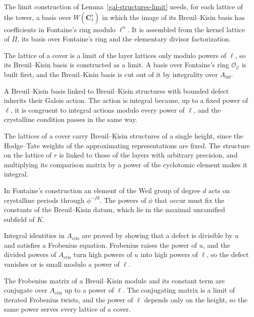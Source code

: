 The limit construction of Lemma~\ref{gal-structures-limit} needs, for each lattice of the tower, a basis over
$W(\mathbf C_\ell^\flat)$ in which the image of its Breuil--Kisin basis has coefficients in Fontaine's ring
modulo $\ell^n$. It is assembled from the kernel lattice of $\Pi$, its basis over Fontaine's ring and the
elementary divisor factorization.

The lattice of a cover is a limit of the layer lattices only modulo powers of $\ell$, so its Breuil--Kisin
basis is constructed as a limit. A basis over Fontaine's ring $\mathcal O_{\mathcal E}$ is built first, and the
Breuil--Kisin basis is cut out of it by integrality over $A_{\inf}$.

A Breuil--Kisin basis linked to Breuil--Kisin structures with bounded defect inherits their Galois action.
The action is integral because, up to a fixed power of $\ell$, it is congruent to integral actions modulo
every power of $\ell$, and the crystalline condition passes in the same way.

The lattices of a cover carry Breuil--Kisin structures of a single height, since the Hodge--Tate weights
of the approximating representations are fixed. The structure on the lattice of $r$ is linked to those
of the layers with arbitrary precision, and multiplying its comparison matrix by a power of the
cyclotomic element makes it integral.

In Fontaine's construction an element of the Weil group of degree $d$ acts on crystalline periods
through $\phi^{-fd}$. The powers of $\phi$ that occur must fix the constants of the Breuil--Kisin datum,
which lie in the maximal unramified subfield of $K$.

Integral identities in $A_{\mathrm{cris}}$ are proved by showing that a defect is divisible by $u$ and
satisfies a Frobenius equation. Frobenius raises the power of $u$, and the divided powers of
$A_{\mathrm{cris}}$ turn high powers of $u$ into high powers of $\ell$, so the defect vanishes or is
small modulo a power of $\ell$.

The Frobenius matrix of a Breuil--Kisin module and its constant term are conjugate over
$A_{\mathrm{cris}}$ up to a power of $\ell$. The conjugating matrix is a limit of iterated Frobenius
twists, and the power of $\ell$ depends only on the height, so the same power serves every lattice of a
cover.

